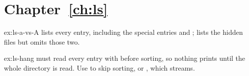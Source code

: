 \section*{Chapter~\ref{ch:ls}}

\begin{solution}{ex:ls-a-vs-A}
 lists every entry, including the special entries  and ;  lists the hidden files but omits those two.
\end{solution}

\begin{solution}{ex:ls-hang}
 must read every entry with  before sorting, so nothing prints until the whole directory is read. Use  to skip sorting, or , which streams.
\end{solution}
